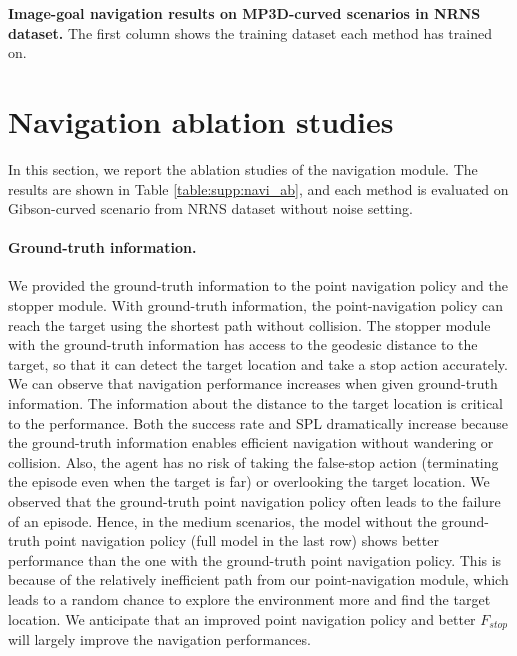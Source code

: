 \documentclass[10pt,twocolumn,letterpaper]{article}
\begin{document}
\begin{table*}[h]
\centering
\resizebox{0.7\linewidth}{!}{

}
\caption{\textbf{Image-goal navigation results on MP3D\cite{mp3d}-curved scenarios in NRNS\cite{NRNS} dataset.} The first column shows the training dataset each method has trained on. }\label{tab:supp:mp3d}
\end{table*}



\section{Navigation ablation studies}
\label{appendix:navi_ab}

In this section, we report the ablation studies of the navigation module.
%
The results are shown in Table \ref{table:supp:navi_ab}, and each method is evaluated on Gibson-curved scenario from NRNS dataset \cite{NRNS} without noise setting.
%
%
\paragraph{Ground-truth information.} 
We provided the ground-truth information to the point navigation policy and the stopper module.
%
With ground-truth information, the point-navigation policy can reach the target using the shortest path without collision.
%
The stopper module with the ground-truth information has access to the geodesic distance to the target, so that it can detect the target location and take a stop action accurately. 
%
We can observe that navigation performance increases when given ground-truth information.
%
The information about the distance to the target location is critical to the performance.
%
Both the success rate and SPL dramatically increase because the ground-truth information enables efficient navigation without wandering or collision.
%
Also, the agent has no risk of taking the false-stop action (terminating the episode even when the target is far) or overlooking the target location.
%
We observed that the ground-truth point navigation policy often leads to the failure of an episode.
%
Hence, in the medium scenarios, the model without the ground-truth point navigation policy (full model in the last row) shows better performance than the one with the ground-truth point navigation policy.
%
This is because of the relatively inefficient path from our point-navigation module, which leads to a random chance to explore the environment more and find the target location.
%
We anticipate that an improved point navigation policy and better $F_{stop}$ will largely improve the navigation performances.
\end{document}
